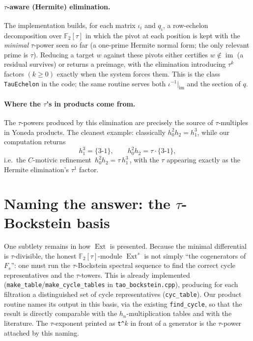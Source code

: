 \documentclass[11pt]{article}
\newcommand{\Ext}{\operatorname{Ext}}
\newcommand{\im}{\operatorname{im}}
\newcommand{\F}{\mathbb{F}}
\theoremstyle{definition}
\begin{document}
\paragraph{$\tau$-aware (Hermite) elimination.}
The implementation builds, for each matrix $\iota_i$ and $q_i$, a row-echelon
decomposition over $\F_2[\tau]$ in which the pivot at each position is kept with the
\emph{minimal} $\tau$-power seen so far (a one-prime Hermite normal form; the only
relevant prime is $\tau$). Reducing a target $w$ against these pivots either
certifies $w\notin\im$ (a residual survives) or returns a preimage, with the
elimination introducing $\tau^{k}$ factors $(k\ge 0)$ exactly when the system forces
them. This is the class \texttt{TauEchelon} in the code; the same routine serves both
$\iota^{-1}|_{\im}$ and the section of $q$.

\paragraph{Where the $\tau$'s in products come from.}
The $\tau$-powers produced by this elimination are precisely the source of
$\tau$-multiples in Yoneda products. The cleanest example: classically
$h_0^2h_2=h_1^3$, while our computation returns
\[
  h_1^3=\{3\text{-}1\},\qquad h_0^2h_2=\tau\cdot\{3\text{-}1\},
\]
i.e.\ the $C$-motivic refinement $\boxed{\,h_0^2h_2=\tau\,h_1^3\,}$, with the $\tau$
appearing exactly as the Hermite elimination's $\tau^1$ factor.

\section{Naming the answer: the $\tau$-Bockstein basis}\label{sec:naming}

One subtlety remains in how $\Ext$ is presented. Because the minimal differential is
$\tau$-divisible, the honest $\F_2[\tau]$-module $\Ext^{s}$ is not simply ``the
cogenerators of $F_s$'': one must run the $\tau$-Bockstein spectral sequence to find
the correct cycle representatives and the $\tau$-towers. This is already implemented
(\texttt{make\_table}/\texttt{make\_cycle\_tables} in \texttt{tao\_bockstein.cpp}),
producing for each filtration a distinguished set of cycle representatives
(\texttt{cyc\_table}). Our product routine names its output in this basis, via the
existing \texttt{find\_cycle}, so that the result is directly comparable with the
$h_n$-multiplication tables and with the literature. The $\tau$-exponent printed as
\texttt{t\^{}$k$} in front of a generator is the $\tau$-power attached by this naming.
\end{document}
